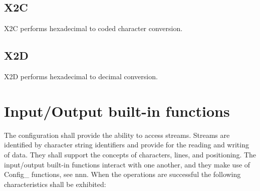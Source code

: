 \subsection{X2C}\label{x2c}

X2C performs hexadecimal to coded character conversion.



\subsection{X2D}\label{x2d}

X2D performs hexadecimal to decimal conversion.



\section{Input/Output built-in
functions}\label{inputoutput-built-in-functions}

The configuration shall provide the ability to access streams. Streams
are identified by character string identifiers and provide for the
reading and writing of data. They shall support the concepts of
characters, lines, and positioning. The input/output built-in functions
interact with one another, and they make use of Config\_ functions, see
nnn. When the operations are successful the following characteristics
shall be exhibited:

